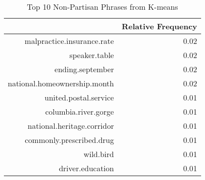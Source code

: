 \begin{table}[ht]
\centering
\begin{tabular}{rr}
  \hline
 & Relative Frequency \\ 
  \hline
malpractice.insurance.rate & 0.02 \\ 
  speaker.table & 0.02 \\ 
  ending.september & 0.02 \\ 
  national.homeownership.month & 0.02 \\ 
  united.postal.service & 0.01 \\ 
  columbia.river.gorge & 0.01 \\ 
  national.heritage.corridor & 0.01 \\ 
  commonly.prescribed.drug & 0.01 \\ 
  wild.bird & 0.01 \\ 
  driver.education & 0.01 \\ 
   \hline
\end{tabular}
\caption{Top 10 Non-Partisan Phrases from K-means} 
\label{tab:k_means_nonpart}
\end{table}
